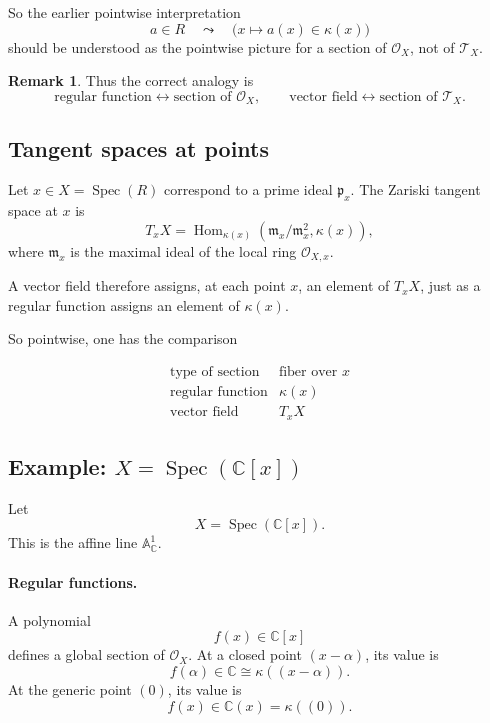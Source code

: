\documentclass[11pt]{article}
\theoremstyle{definition}
\newtheorem{remark}[theorem]{Remark}
\newcommand{\C}{\mathbb{C}}
\newcommand{\Spec}{\operatorname{Spec}}
\newcommand{\kk}[1]{\kappa\!\left(#1\right)}
\begin{document}
	So the earlier pointwise interpretation
	\[
	a\in R
	\quad\leadsto\quad
	\bigl(x\mapsto a(x)\in \kk{x}\bigr)
	\]
	should be understood as the pointwise picture for a section of \(\mathcal O_X\), not of \(\mathcal T_X\).
	
	\begin{remark}
		Thus the correct analogy is
		\[
		\boxed{
			\text{regular function} \leftrightarrow \text{section of }\mathcal O_X,
			\qquad
			\text{vector field} \leftrightarrow \text{section of }\mathcal T_X.
		}
		\]
	\end{remark}
	
	\subsection{Tangent spaces at points}
	
	Let \(x\in X=\Spec(R)\) correspond to a prime ideal \(\mathfrak p_x\).  
	The Zariski tangent space at \(x\) is
	\[
	T_xX
	=
	\operatorname{Hom}_{\kk{x}}\!\left(\mathfrak m_x/\mathfrak m_x^2,\kk{x}\right),
	\]
	where \(\mathfrak m_x\) is the maximal ideal of the local ring \(\mathcal O_{X,x}\).
	
	A vector field therefore assigns, at each point \(x\), an element of \(T_xX\), just as a regular function assigns an element of \(\kk{x}\).
	
	So pointwise, one has the comparison
	
	\[
	\begin{array}{c|c}
		\text{type of section} & \text{fiber over }x \\
		\hline
		\text{regular function} & \kk{x} \\
		\text{vector field} & T_xX
	\end{array}
	\]
	
	\subsection{Example: \texorpdfstring{$X=\Spec(\C[x])$}{X=Spec(C[x])}}
	
	Let
	\[
	X=\Spec(\C[x]).
	\]
	This is the affine line \(\mathbb A^1_\C\).
	
	\paragraph{Regular functions.}
	A polynomial
	\[
	f(x)\in \C[x]
	\]
	defines a global section of \(\mathcal O_X\).  
	At a closed point \((x-\alpha)\), its value is
	\[
	f(\alpha)\in \C\cong \kk{(x-\alpha)}.
	\]
	At the generic point \((0)\), its value is
	\[
	f(x)\in \C(x)=\kk{(0)}.
	\]
	
\end{document}
